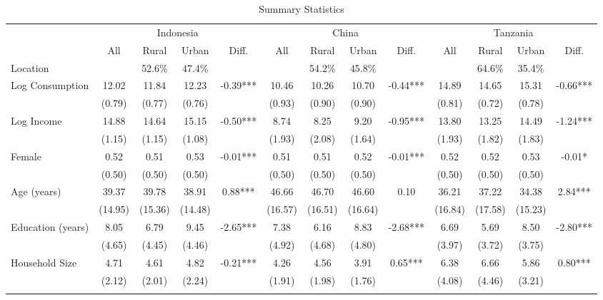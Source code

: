 \begin{table} \centering
\caption{Summary Statistics}\label{tab:summary_stats_combined_unb}
\begin{threeparttable}
\begin{tabular}{l cccc cccc cccc} \toprule
& \multicolumn{4}{c}{Indonesia} & \multicolumn{4}{c}{China} & \multicolumn{4}{c}{Tanzania} \\
\cmidrule(lr){2-5} \cmidrule(lr){6-9} \cmidrule(lr){10-13}
& All & Rural & Urban & Diff. & All & Rural & Urban & Diff. & All & Rural & Urban & Diff. \\
Location &  &   52.6\% &   47.4\% &  &  &   54.2\% &   45.8\% &  &  &   64.6\% &   35.4\% &  \\  \addlinespace \addlinespace
Log Consumption & 12.02 & 11.84 & 12.23 & -0.39*** & 10.46 & 10.26 & 10.70 & -0.44*** & 14.89 & 14.65 & 15.31 & -0.66*** \\
 & (0.79) & (0.77) & (0.76) &  & (0.93) & (0.90) & (0.90) &  & (0.81) & (0.72) & (0.78) &  \\  \addlinespace
Log Income & 14.88 & 14.64 & 15.15 & -0.50*** & 8.74 & 8.25 & 9.20 & -0.95*** & 13.80 & 13.25 & 14.49 & -1.24*** \\
 & (1.15) & (1.15) & (1.08) &  & (1.93) & (2.08) & (1.64) &  & (1.93) & (1.82) & (1.83) &  \\  \addlinespace
Female & 0.52 & 0.51 & 0.53 & -0.01*** & 0.51 & 0.51 & 0.52 & -0.01*** & 0.52 & 0.52 & 0.53 & -0.01* \\
 & (0.50) & (0.50) & (0.50) &  & (0.50) & (0.50) & (0.50) &  & (0.50) & (0.50) & (0.50) &  \\  \addlinespace
Age (years) & 39.37 & 39.78 & 38.91 & 0.88*** & 46.66 & 46.70 & 46.60 & 0.10 & 36.21 & 37.22 & 34.38 & 2.84*** \\
 & (14.95) & (15.36) & (14.48) &  & (16.57) & (16.51) & (16.64) &  & (16.84) & (17.58) & (15.23) &  \\  \addlinespace
Education (years) & 8.05 & 6.79 & 9.45 & -2.65*** & 7.38 & 6.16 & 8.83 & -2.68*** & 6.69 & 5.69 & 8.50 & -2.80*** \\
 & (4.65) & (4.45) & (4.46) &  & (4.92) & (4.68) & (4.80) &  & (3.97) & (3.72) & (3.75) &  \\  \addlinespace
Household Size & 4.71 & 4.61 & 4.82 & -0.21*** & 4.26 & 4.56 & 3.91 & 0.65*** & 6.38 & 6.66 & 5.86 & 0.80*** \\
 & (2.12) & (2.01) & (2.24) &  & (1.91) & (1.98) & (1.76) &  & (4.08) & (4.46) & (3.21) &  \\  \addlinespace

\end{tabular}
\end{threeparttable}
\end{table}
